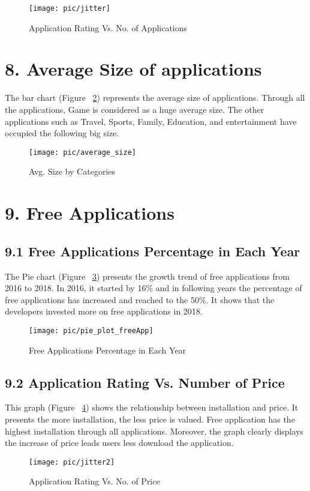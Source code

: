 \begin{figure}
\centering
\texttt{[image: pic/jitter]}
\caption{Application Rating Vs. No. of Applications} 
\label{fig:8}
\end{figure}

\section*{8. Average Size of applications}
The bar chart (Figure ~\ref{fig:9}) represents the average size of applications. Through all the applications, Game is considered as a huge average size. The other applications such as Travel, Sports, Family, Education, and entertainment have occupied the following big size.
\begin{figure}
\centering
\texttt{[image: pic/average\_size]}
\caption{Avg. Size by Categories} 
\label{fig:9}
\end{figure}


\section*{9. Free Applications}
\subsection*{9.1 Free Applications Percentage in Each Year}
The Pie chart (Figure ~\ref{fig:10}) presents the growth trend of free applications from 2016 to 2018. In 2016, it started by 16\% and in following years the percentage of free applications has increased and reached to the 50\%. It shows that the developers invested more on free applications in 2018.
\begin{figure}
\centering
\texttt{[image: pic/pie\_plot\_freeApp]}
\caption{Free Applications Percentage in Each Year} 
\label{fig:10}
\end{figure}

\subsection*{9.2 Application Rating Vs. Number of Price}
This graph (Figure ~\ref{fig:11}) shows the relationship between installation and price. It presents the more installation, the less price is valued. Free application has the highest installation through all applications. Moreover, the graph clearly displays the increase of price leads users less download the application.
\begin{figure}
\centering
\texttt{[image: pic/jitter2]}
\caption{Application Rating Vs. No. of Price} 
\label{fig:11}
\end{figure}



